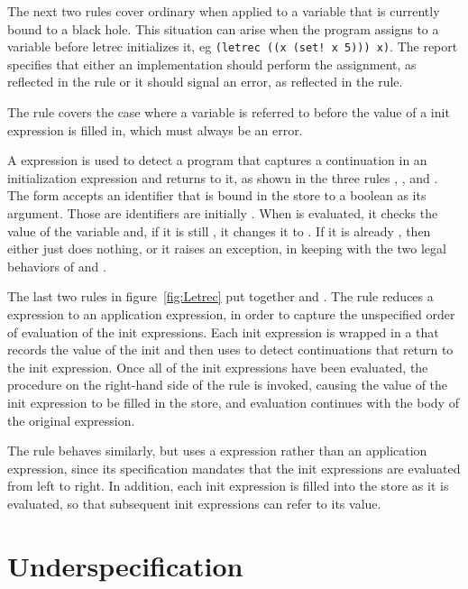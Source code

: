 The next two rules cover ordinary  when applied to a variable that is currently bound to a black hole. This situation can arise when the program assigns to a variable before letrec initializes it, eg \verb|(letrec ((x (set! x 5))) x)|. The report specifies that either an implementation should perform the assignment, as reflected in the  rule or it should signal an error, as reflected in the  rule.

The  rule covers the case where a variable is referred to before the value of a init expression is filled in, which must always be an error.

A  expression is used to detect a program that captures a continuation in an initialization expression and returns to it, as shown in the three rules , , and . The  form accepts an identifier that is bound in the store to a boolean as its argument. Those are identifiers are initially \semfalse{}. When  is evaluated, it checks the value of the variable and, if it is still \semfalse{}, it changes it to \semtrue{}. If it is already \semtrue{}, then  either just does nothing, or it raises an exception, in keeping with the two legal behaviors of  and . 

The last two rules in figure~\ref{fig:Letrec} put together  and . The  rule reduces a  expression to an application expression, in order to capture the unspecified order of evaluation of the init expressions. Each init expression is wrapped in a  that records the value of the init and then uses  to detect continuations that return to the init expression. Once all of the init expressions have been evaluated, the procedure on the right-hand side of the rule is invoked, causing the value of the init expression to be filled in the store, and evaluation continues with the body of the original  expression.

The  rule behaves similarly, but uses a  expression rather than an application expression, since its specification mandates that the init expressions are evaluated from left to right. In addition, each init expression is filled into the store as it is evaluated, so that subsequent init expressions can refer to its value.

\section{Underspecification}\label{sec:semantics:underspecification}

